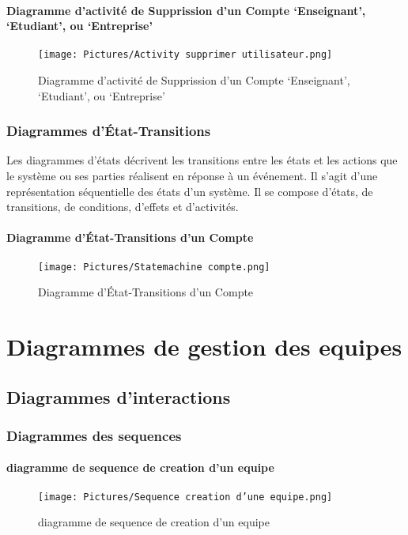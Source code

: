\documentclass[11pt,fleqn]{book} %
\begin{document}
\subsubsection{Diagramme d’activité de Supprission d’un 
Compte ‘Enseignant’, ‘Etudiant’, ou ‘Entreprise’}
\begin{figure}[h]
    \centering
    \texttt{[image: Pictures/Activity supprimer utilisateur.png]}
    \caption{Diagramme d’activité de Supprission d’un 
Compte ‘Enseignant’, ‘Etudiant’, ou ‘Entreprise’}
    \label{fig:pca}
\end{figure}
\newpage
\subsection{ Diagrammes d’État-Transitions}
Les diagrammes d'états décrivent les transitions entre les états et les actions que le
système ou ses parties réalisent en réponse à un événement.
Il s'agit d'une représentation séquentielle des états d'un système. Il se compose d’états,
de transitions, de conditions, d’effets et d’activités.
\subsubsection{Diagramme d’État-Transitions d’un Compte}
\begin{figure}[h]
    \centering
    \texttt{[image: Pictures/Statemachine compte.png]}
    \caption{Diagramme d’État-Transitions d’un Compte}
    \label{fig:pca}
\end{figure}
\chapter{Diagrammes de gestion des equipes}
\section{Diagrammes d'interactions}
\subsection{Diagrammes des sequences}
\newpage
\subsubsection{diagramme de sequence de creation d'un equipe}
\begin{figure}[h]
    \centering
    \texttt{[image: Pictures/Sequence creation d'une equipe.png]}
    \caption{diagramme de sequence de creation d'un equipe}
    \label{fig:pca}
\end{figure}
\newpage
\end{document}

